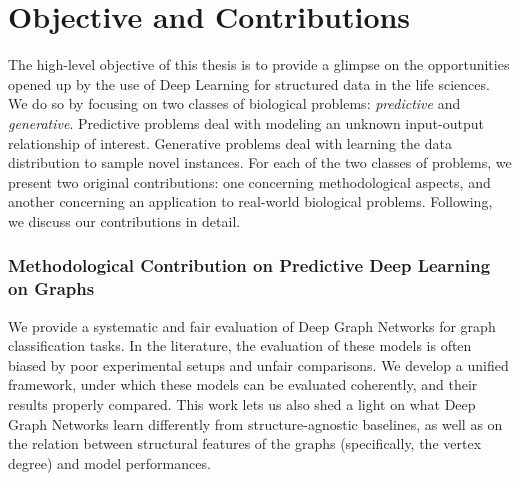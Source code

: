 \section{Objective and Contributions}
The high-level objective of this thesis is to provide a glimpse on the opportunities opened up by the use of Deep Learning for structured data in the life sciences. We do so by focusing on two classes of biological problems: \emph{predictive} and \emph{generative}. Predictive problems deal with modeling an unknown input-output relationship of interest. Generative problems deal with learning the data distribution to sample novel instances. For each of the two classes of problems, we present two original contributions: one concerning methodological aspects, and another concerning an application to real-world biological problems. Following, we discuss our contributions in detail.

\subsubsection*{Methodological Contribution on Predictive Deep Learning on Graphs}
We provide a systematic and fair evaluation of Deep Graph Networks for graph classification tasks. In the literature, the evaluation of these models is often biased by poor experimental setups and unfair comparisons. We develop a unified framework, under which these models can be evaluated coherently, and their results properly compared. This work lets us also shed a light on what Deep Graph Networks learn differently from structure-agnostic baselines, as well as on the relation between structural features of the graphs (specifically, the vertex degree) and model performances.

